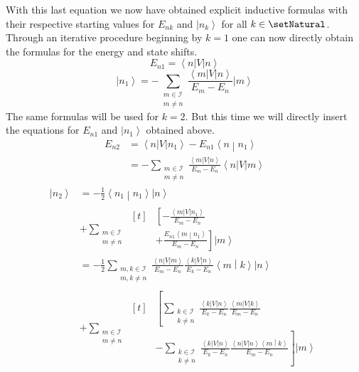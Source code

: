 \documentclass[10pt,fleqn]{article}
\newcommand{\bra}[1]{\left\langle #1 \right\vert}
\newcommand{\ket}[1]{\left\vert #1 \right\rangle}
\newcommand{\bracket}[2]{\left\langle #1 \middle\vert #2 \right\rangle}
\begin{document}
\begin{multicols}{2}
      With this last equation we now have obtained explicit inductive formulas with their respective starting values for $E_{nk}$ and $\ket{n_k}$ for all $k\in\setNatural$.
      Through an iterative procedure beginning by $k=1$ one can now directly obtain the formulas for the energy and state shifts.
      \[
        E_{n1} = \bra{n}V\ket{n}
      \]
      \[
        \ket{n_1} = - \sum_{\substack{m\in\mathscr{I} \\ m\neq n}} \frac{\bra{m}V\ket{n}}{E_m-E_n} \ket{m}
      \]
      The same formulas will be used for $k=2$.
      But this time we will directly insert the equations for $E_{n1}$ and $\ket{n_1}$ obtained above.
      \begin{align*}
        E_{n2}
        &= \bra{n}V\ket{n_1} - E_{n1}\bracket{n}{n_1} \\
        &= -\sum_{\substack{m\in\mathscr{I} \\ m\neq n}} \frac{\bra{m}V\ket{n}}{E_m-E_n} \bra{n}V\ket{m}
      \end{align*}
      \begin{align*}
        \ket{n_2}
        &= -\frac{1}{2} \bracket{n_1}{n_{1}}\ket{n} \\
        &+ \sum_{\substack{m\in\mathscr{I}\\m\neq n}}
          \begin{aligned}[t]
            &\left[ -\frac{\bra{m}V\ket{n_{1}}}{E_m-E_n} \right. \\
            &\left. + \frac{E_{n1}\bracket{m}{n_{1}}}{E_m - E_n} \right] \ket{m}
          \end{aligned}
        \\
        &= -\frac{1}{2} \sum_{\substack{m,k\in\mathscr{I}\\m,k\neq n}} \frac{\bra{n}V\ket{m}}{E_m-E_n} \frac{\bra{k}V\ket{n}}{E_k-E_n} \bracket{m}{k} \ket{n} \\
        &+ \sum_{\substack{m\in\mathscr{I}\\m\neq n}}
          \begin{aligned}[t]
            &\left[ \sum_{\substack{k\in\mathscr{I} \\ k\neq n}} \frac{\bra{k}V\ket{n}}{E_k-E_n} \frac{\bra{m}V\ket{k}}{E_m-E_n} \right. \\
            &\left. - \sum_{\substack{k\in\mathscr{I} \\ k\neq n}} \frac{\bra{k}V\ket{n}}{E_k-E_n} \frac{\bra{n}V\ket{n} \bracket{m}{k}}{E_m - E_n} \right] \ket{m}
          \end{aligned}
        \\

\end{align*}
\end{multicols}
\end{document}
